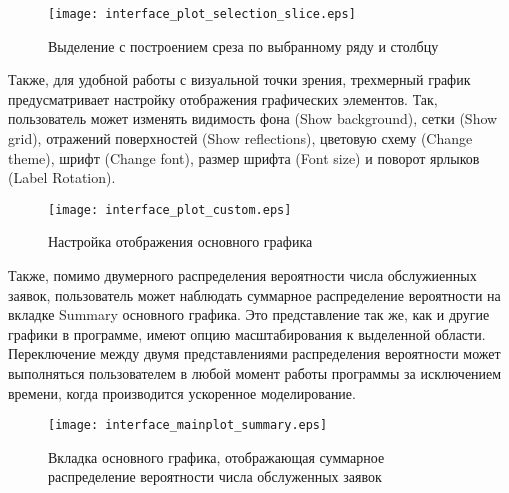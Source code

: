 \begin{figure}[H]
	\centering
	\texttt{[image: interface\_plot\_selection\_slice.eps]}
	\caption{Выделение с построением среза по выбранному ряду и столбцу}
	\label{interface_plot_selection_slice}
\end{figure}
Также, для удобной работы с визуальной точки зрения, трехмерный график предусматривает настройку отображения графических элементов. Так, пользователь может изменять видимость фона (Show background), сетки (Show grid), отражений поверхностей (Show reflections), цветовую схему (Change theme), шрифт (Change font), размер шрифта (Font size) и поворот ярлыков (Label Rotation). 

\begin{figure}[H]
	\centering
	\texttt{[image: interface\_plot\_custom.eps]}
	\caption{Настройка отображения основного графика}
	\label{interface_plot_custom}
\end{figure}

Также, помимо двумерного распределения вероятности числа обслужиенных заявок, пользователь может наблюдать суммарное распределение вероятности на вкладке Summary основного графика. Это представление так же, как и другие графики в программе, имеют опцию масштабирования к выделенной области. Переключение между двумя представлениями распределения вероятности может выполняться пользователем в любой момент работы программы за исключением времени, когда производится ускоренное моделирование. 
\begin{figure}[H]
	\centering
	\texttt{[image: interface\_mainplot\_summary.eps]}
	\caption{Вкладка основного графика, отображающая суммарное распределение вероятности числа обслуженных заявок}
	\label{interface_mainplot_summary}
\end{figure}

